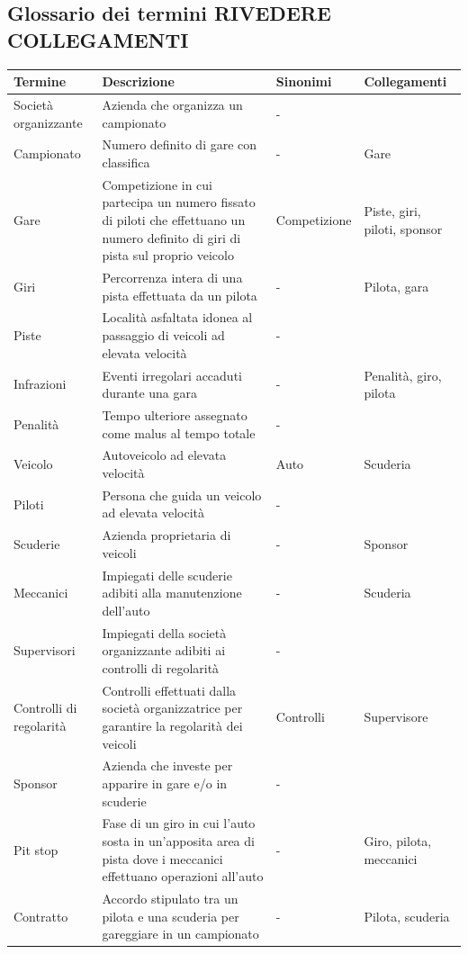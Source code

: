 \documentclass[11pt]{article}
\begin{document}
\subsection{Glossario dei termini \textbf{RIVEDERE COLLEGAMENTI}}
\begin{tabularx}{\linewidth}{
        |>{\hsize=0.9\hsize}X|%
        >{\hsize=1.8\hsize}X|%
        >{\hsize=0.6\hsize}X|%
        >{\hsize=0.7\hsize}X|%
    }
    \hline
    \textbf{Termine} & \textbf{Descrizione} & \textbf{Sinonimi} & \textbf{Collegamenti} \\
    \hline
    Società organizzante & Azienda che organizza un campionato & - & \\
    \hline
    Campionato & Numero definito di gare con classifica & - & Gare \\
    \hline
    Gare & Competizione in cui partecipa un numero fissato di piloti che effettuano un numero definito di giri di pista sul proprio veicolo & Competizione & Piste, giri, piloti, sponsor \\
    \hline
    Giri & Percorrenza intera di una pista effettuata da un pilota & - & Pilota, gara \\
    \hline
    Piste & Località asfaltata idonea al passaggio di veicoli ad elevata velocità & - & \\
    \hline
    Infrazioni & Eventi irregolari accaduti durante una gara & - & Penalità, giro, pilota \\
    \hline
    Penalità & Tempo ulteriore assegnato come malus al tempo totale & - & \\
    \hline
    Veicolo & Autoveicolo ad elevata velocità & Auto & Scuderia \\
    \hline
    Piloti & Persona che guida un veicolo ad elevata velocità & - & \\
    \hline
    Scuderie & Azienda proprietaria di veicoli & - & Sponsor \\
    \hline
    Meccanici & Impiegati delle scuderie adibiti alla manutenzione dell'auto & - & Scuderia \\
    \hline
    Supervisori & Impiegati della società organizzante adibiti ai controlli di regolarità & - & \\
    \hline
    Controlli di regolarità & Controlli effettuati dalla società organizzatrice per garantire la regolarità dei veicoli & Controlli & Supervisore \\
    \hline
    Sponsor & Azienda che investe per apparire in gare e/o in scuderie & - & \\
    \hline
    Pit stop & Fase di un giro in cui l'auto sosta in un'apposita area di pista dove i meccanici effettuano operazioni all'auto & - & Giro, pilota, meccanici \\
    \hline
    Contratto & Accordo stipulato tra un pilota e una scuderia per gareggiare in un campionato & - & Pilota, scuderia \\
    \hline
\end{tabularx}
\end{document}

